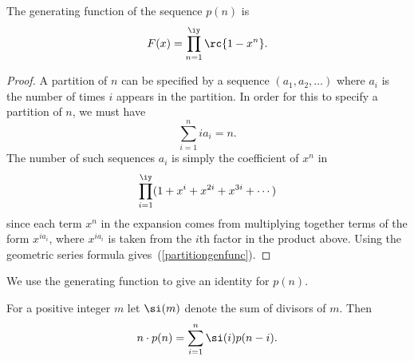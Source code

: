\begin{thm}\label{partitiongf}
The generating function of the sequence $p(n)$ is
\begin{equation}\label{partitiongenfunc}
F(x)=\prod_{n=1}^{\iy}\rc{1-x^n}.
\end{equation}
\end{thm}
\begin{proof}
A partition of $n$ can be specified by a sequence $(a_1,a_2,\ldots)$ where $a_i$ is the number of times $i$ appears in the partition. In order for this to specify a partition of $n$, we must have
\[\sum_{i=1}^n ia_i=n.\]
The number of such sequences $a_i$ is simply the coefficient of $x^n$ in
\[
\prod_{i=1}^{\iy}(1+x^i+x^{2i}+x^{3i}+\cdots )
\]
since each term $x^n$ in the expansion comes from multiplying together terms of the form $x^{ia_i}$, where $x^{ia_i}$ is taken from the $i$th factor in the product above. Using the geometric series formula gives~(\ref{partitiongenfunc}).
\end{proof}
We use the generating function to give an identity for $p(n)$.
\begin{ex}
For a positive integer $m$ let $\si(m)$ denote the sum of divisors of $m$. Then
\[
n\cdot p(n)=\sum_{i=1}^n \si(i)p(n-i).
\]
\end{ex}
